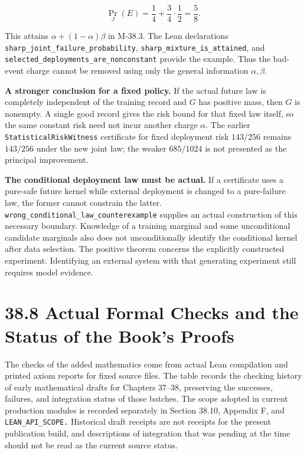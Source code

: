 \documentclass[
  english,
  11pt,
  oneside]{book}
\newcounter{none} %
\begin{document}
\[\Pr_J(E)=\frac14+\frac34\cdot\frac12=\frac58.\]

This attains \(\alpha+(1-\alpha)\beta\) in M-38.3. The Lean declarations \nolinkurl{sharp_joint_failure_probability}, \nolinkurl{sharp_mixture_is_attained}, and \nolinkurl{selected_deployments_are_nonconstant} provide the example. Thus the bad-event charge cannot be removed using only the general information \(\alpha,\beta\).

\textbf{A stronger conclusion for a fixed policy.} If the actual future law is completely independent of the training record and \(G\) has positive mass, then \(G\) is nonempty. A single good record gives the risk bound for that fixed law itself, so the same constant risk need not incur another charge \(\alpha\). The earlier \nolinkurl{StatisticalRiskWitness} certificate for fixed deployment risk \(143/256\) remains \(143/256\) under the new joint law; the weaker \(685/1024\) is not presented as the principal improvement.

\textbf{The conditional deployment law must be actual.} If a certificate uses a pure-safe future kernel while external deployment is changed to a pure-failure law, the former cannot constrain the latter. \nolinkurl{wrong_conditional_law_counterexample} supplies an actual construction of this necessary boundary. Knowledge of a training marginal and some unconditional candidate marginals also does not unconditionally identify the conditional kernel after data selection. The positive theorem concerns the explicitly constructed experiment. Identifying an external system with that generating experiment still requires model evidence.

\section{38.8 Actual Formal Checks and the Status of the Book's Proofs}\label{actual-formal-checks-and-the-status-of-the-books-proofs}

The checks of the added mathematics come from actual Lean compilation and printed axiom reports for fixed source files. The table records the checking history of early mathematical drafts for Chapters 37--38, preserving the successes, failures, and integration status of those batches. The scope adopted in current production modules is recorded separately in Section 38.10, Appendix F, and \nolinkurl{LEAN_API_SCOPE.} Historical draft receipts are not receipts for the present publication build, and descriptions of integration that was pending at the time should not be read as the current source status.
\end{document}
